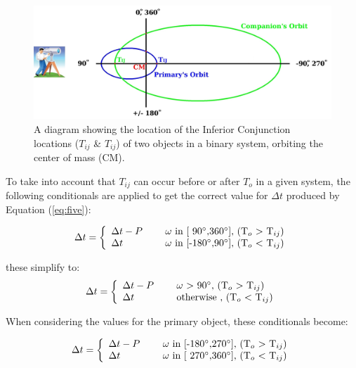 \documentclass[12pt,preprint]{aastex}
\begin{document}
\begin{figure}[htp]
\begin{center}
\includegraphics[scale=0.31]{TcToEllipses2-withTelescope4.jpeg}
\caption[Binary Inferior Conjunction Diagram]{A diagram showing the location of the Inferior Conjunction locations ({\color{green}$T_{ij}$} \& {\color{blue}$T_{ij}$}) of two objects in a binary system, orbiting the center of mass ({\color{red}CM}).}
\label{fig:ToTcDiagram}
\end{center}
\end{figure}

To take into account that $T_{ij}$ can occur before or after $T_{o}$ in a given system, the following conditionals are applied to get the correct value for $\Delta t$ produced by Equation (\ref{eq:five}):

\begin{equation}\label{eq:ToTcCorrections1a}
\Delta t = \left\{ \begin{array}{l l} \Delta t-P& \quad \text{ $\omega$ in [ 90$^{\circ}$,360$^{\circ}$], (T$_o$ $>$ T$_{ij}$)}\\  \Delta t& \quad \text{ $\omega$ in [-180$^{\circ}$,90$^{\circ}$], (T$_o$ $<$ T$_{ij}$)} \end{array} \right.
\end{equation}

these simplify to:
\begin{equation}\label{eq:ToTcCorrections1b}
\Delta t = \left\{ \begin{array}{l l} \Delta t-P& \quad \text{ $\omega$ $>$ 90$^{\circ}$, (T$_o$ $>$ T$_{ij}$)}\\  \Delta t& \quad \text{ otherwise , (T$_o$ $<$ T$_{ij}$)} \end{array} \right.
\end{equation}

When considering the values for the primary object, these conditionals become:

\begin{equation}\label{eq:ToTcCorrections2a}
\Delta t = \left\{ \begin{array}{l l} \Delta t-P& \quad \text{ $\omega$ in [-180$^{\circ}$,270$^{\circ}$], (T$_o$ $>$ T$_{ij}$)}\\  \Delta t& \quad \text{ $\omega$ in [ 270$^{\circ}$,360$^{\circ}$], (T$_o$ $<$ T$_{ij}$)} \end{array} \right.
\end{equation}
\end{document}
